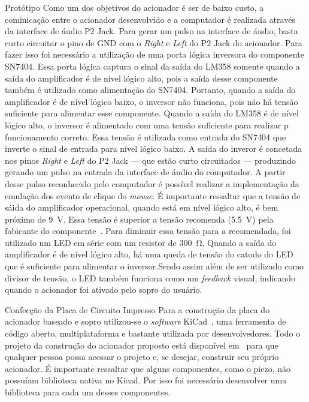 \begin{chapter}{Protótipo}
Como um dos objetivos do acionador é ser de baixo custo, a cominicação entre o
acionador desenvolvido e a computador é realizada através da interface de áudio
P2 Jack. Para gerar um pulso na interface de áudio, basta curto circuitar o pino
de GND com o \textit{Right} e \textit{Left} do P2 Jack do acionador. Para fazer
isso foi necessário a utilização de uma porta lógica inversora do componente
SN7404. Essa porta lógica captura o sinal da saída do LM358 somente quando a
saída do amplificador é de nível lógico alto, pois a saída desse componente
também é utilizado como alimentação do SN7404. Portanto, quando a saída do
amplificador é de nível lógico baixo, o inversor não funciona, pois não há
tensão suficiente para alimentar esse componente. Quando a saída do LM358 é de
nível lógico alto, o inversor é alimentado com uma tensão suficiente para
realizar p funcionamento correto. Essa tensão é utilizada como entrada do
SN7404 que inverte o sinal de entrada para nível lógico baixo. A saída do
inveror é concetada nos pinos  \textit{Right} e \textit{Left} do P2 Jack --- que
estão curto circuitados --- produzindo gerando um pulso na entrada da interface
de áudio do computador. A partir desse pulso reconhecido pelo computador é
possível realizar a implementação da emulação dos evento de clique do
\textit{mouse}. É importante ressaltar que a tensão de sáida do amplificador
operacional, quando está em nível lógico alto, é bem próximo de 9~V. Essa tensão
é superior a tensão recomenda (5.5~V) pela fabicante do componente~\cite{7404}. 
Para diminuir essa tensão para a recomendada, foi utilizado um LED em série com
um resistor de 300~\si{\ohm}. Quando a saída do amplificador é de nível lógico
alto, há uma queda de tensão do catodo do LED que é suficiente para alimentar o
inversor.Sendo assim além de ser utilizado como divisor de tensão, o LED também
funciona como um \textit{feedback} visual, indicando quando o acionador foi
ativado pelo sopro do usuário.  


\begin{section}{Confecção da Placa de Circuito Impresso}
Para a construção da placa do acionador baseado e sopro utilizou-se o
\textit{software} KiCad~\cite{kicad}, uma ferramenta de código aberto,
multiplataforma e bastante utilizada por desenvolvedores. Todo o projeto da
construção do acionador proposto está disponível em~\cite{ErickGit} para que
qualquer pessoa possa acessar o projeto e, se desejar, construir seu próprio
acionador. É importante ressaltar que alguns componentes, como o piezo, não
possuíam biblioteca nativa no Kicad. Por isso foi necessário desenvolver uma 
biblioteca para cada um desses componentes.


\end{section}
\end{chapter}
